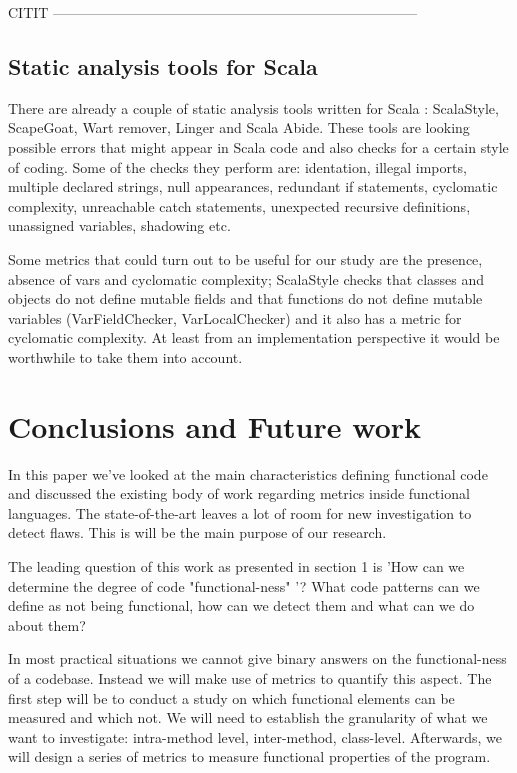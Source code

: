 \documentclass{article}
\begin{document}
CITIT
------------------------------------------------------------------------------
\subsection {Static analysis tools for Scala}
There are already a couple of static analysis tools written for Scala : ScalaStyle, ScapeGoat, Wart remover, Linger and Scala Abide. These tools are looking possible errors that might appear in Scala code and also checks for a certain style of coding. Some of the checks they perform are: identation, illegal imports, multiple declared strings, null appearances, redundant if statements, cyclomatic complexity, unreachable catch statements, unexpected recursive definitions, unassigned variables, shadowing etc. \par

Some metrics that could turn out to be useful for our study are  the presence, absence of vars and cyclomatic complexity; ScalaStyle checks that classes and objects do not define mutable fields and that functions do not define mutable variables (VarFieldChecker, VarLocalChecker) \cite{scalastyle} and it also has a metric for cyclomatic complexity. At least from an implementation perspective it would be worthwhile to take them into account.\par

\section{Conclusions and Future work}
In this paper we've looked at the main characteristics defining functional code and discussed the existing body of work regarding metrics inside functional languages. The state-of-the-art leaves a lot of room for new investigation to detect flaws. This is will be the main purpose of our research.

The leading question of this work as presented in  section 1  is  'How can we determine the degree of code "functional-ness" '? What code patterns can we define as not being functional, how can we detect them and what can we do about them? \par

In most practical situations we cannot give binary answers on the functional-ness of a codebase. Instead we will make use of metrics to quantify this aspect. The first step will be to conduct a study on which functional elements can be measured and which not. We will need to establish the granularity of what we want to investigate: intra-method level, inter-method, class-level. Afterwards, we will design a series of metrics to measure functional properties of the program. \par
\end{document}
